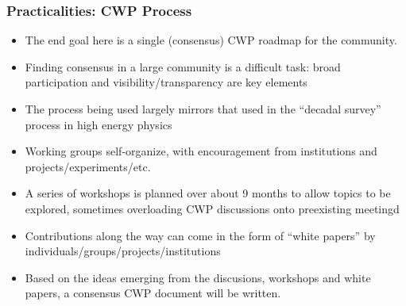 \begin{frame}
\frametitle{Practicalities: CWP Process}

\begin{itemize}
\item The end goal here is a single (consensus) CWP roadmap for the community. 
\item Finding consensus in a large community is a difficult task: broad participation and visibility/transparency are key elements
\item The process being used largely mirrors that used in the ``decadal survey'' process in high energy physics
\item Working groups self-organize, with encouragement from institutions and projects/experiments/etc.
\item A series of workshops is planned over about 9 months to allow topics to be explored, sometimes overloading CWP discussions onto preexisting meetingd
\item Contributions along the way can come in the form of ``white papers'' by individuals/groups/projects/institutions
\item Based on the ideas emerging from the discusions, workshops and white papers, a consensus CWP document will be written.
\end{itemize}

\end{frame}


